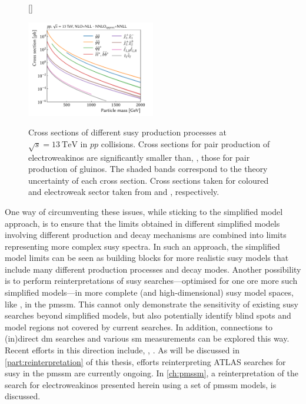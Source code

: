 \begin{figure}
[\FBwidth]
{\caption{Cross sections of different \gls{susy} production processes at $\sqrt{s}=\SI{13}{\TeV}$ in $pp$ collisions. Cross sections for pair production of electroweakinos are significantly smaller than, \eg, those for pair production of gluinos. The shaded bands correspond to the theory uncertainty of each cross section. Cross sections taken for coloured and electroweak sector taken from \cite{Beenakker:2016lwe,Beneke:2009ye} and \cite{Fiaschi:2018hgm,Fuks:2012qx,Fiaschi:2018xdm}, respectively.}\label{fig:SUSY_xsecs}}
{\includegraphics[width=0.5\textwidth]{SUSY_xsecs}}
\end{figure}

One way of circumventing these issues, while sticking to the simplified model approach, is to ensure that the limits obtained in different simplified models involving different production and decay mechanisms are combined into limits representing more complex \gls{susy} spectra.
In such an approach, the simplified model limits can be seen as building blocks for more realistic \gls{susy} models that include many different production processes and decay modes.
Another possibility is to perform reinterpretations of \gls{susy} searches---optimised for one ore more such simplified models---in more complete (and high-dimensional) \gls{susy} model spaces, like \eg, in the \gls{pmssm}. This cannot only demonstrate the sensitivity of existing \gls{susy} searches beyond simplified models, but also potentially identify blind spots and model regions not covered by current searches.
In addition, connections to (in)direct \gls{dm} searches and various \gls{sm} measurements can be explored this way. Recent efforts in this direction include, \eg, \cite{Ambrogi:2017lov, Aaboud:2016wna, pMSSM-scan-run1:2015baa}. As will be discussed in \cref{part:reinterpretation} of this thesis, efforts reinterpreting ATLAS searches for \gls{susy} in the \gls{pmssm} are currently ongoing. In \cref{ch:pmssm}, a reinterpretation of the search for electroweakinos presented herein using a set of \gls{pmssm} models, is discussed.


